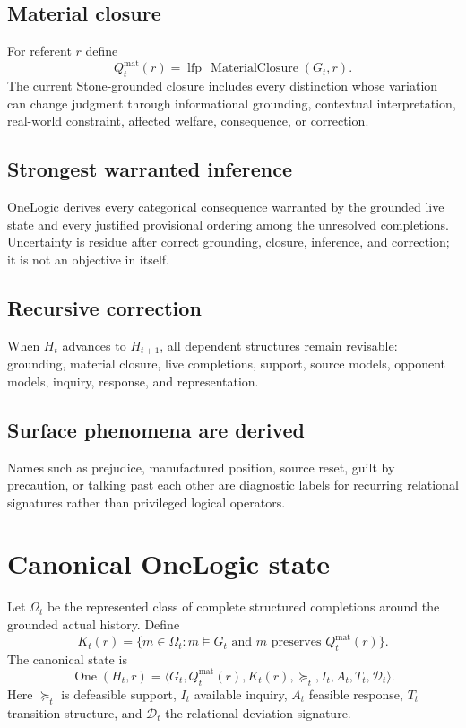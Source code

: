 \documentclass[11pt]{article}
\begin{document}
\subsection{Material closure}
For referent $r$ define
\[
Q^{\mathrm{mat}}_t(r)=\operatorname{lfp}\,\operatorname{MaterialClosure}(G_t,r).
\]
The current Stone-grounded closure includes every distinction whose variation can change judgment through informational grounding, contextual interpretation, real-world constraint, affected welfare, consequence, or correction.

\subsection{Strongest warranted inference}
OneLogic derives every categorical consequence warranted by the grounded live state and every justified provisional ordering among the unresolved completions. Uncertainty is residue after correct grounding, closure, inference, and correction; it is not an objective in itself.

\subsection{Recursive correction}
When $H_t$ advances to $H_{t+1}$, all dependent structures remain revisable: grounding, material closure, live completions, support, source models, opponent models, inquiry, response, and representation.

\subsection{Surface phenomena are derived}
Names such as prejudice, manufactured position, source reset, guilt by precaution, or talking past each other are diagnostic labels for recurring relational signatures rather than privileged logical operators.

\section{Canonical OneLogic state}
Let $\Omega_t$ be the represented class of complete structured completions around the grounded actual history. Define
\[
K_t(r)=\{m\in\Omega_t:m\models G_t\text{ and }m\text{ preserves }Q^{\mathrm{mat}}_t(r)\}.
\]
The canonical state is
\[
\operatorname{One}(H_t,r)=
\langle G_t,Q^{\mathrm{mat}}_t(r),K_t(r),\succeq_t,I_t,A_t,T_t,\mathcal D_t\rangle.
\]
Here $\succeq_t$ is defeasible support, $I_t$ available inquiry, $A_t$ feasible response, $T_t$ transition structure, and $\mathcal D_t$ the relational deviation signature.
\end{document}
